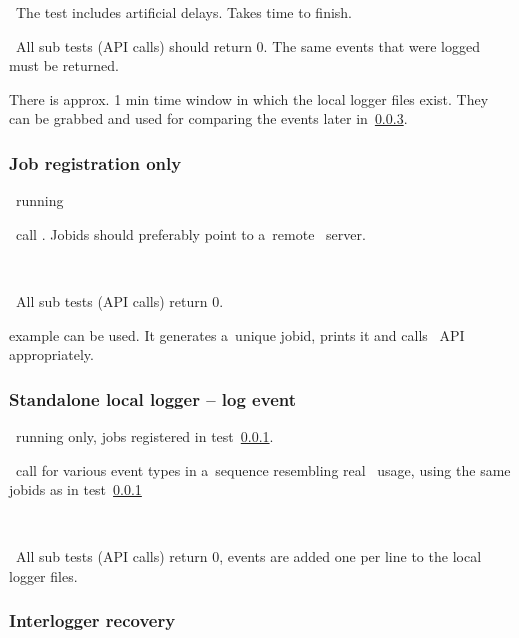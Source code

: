 \note\ The test includes artificial delays. Takes time to finish.

\result\ All sub tests (API calls) should return 0. The same events that were logged must be returned.

\begin{hints}
There is approx. 1 min time window in which the local logger files exist.
They can be grabbed and used for comparing the events later in~\ref{recover}.
\end{hints}



\subsubsection{Job registration only}
\label{reg}
\req\ running 

\what\ call . Jobids should preferably point
to a~remote \LB\ server.

\how\ 

\result\ All sub tests (API calls) return 0.

\begin{hints}
 example can be used. It generates a~unique jobid,
prints it and calls \LB\ API appropriately.
\end{hints}



\subsubsection{Standalone local logger -- log event}
\label{log}

\req\ running  only, jobs registered in test~\ref{reg}.

\what\ call  for various event types in a~sequence
resembling real \LB\ usage, using the same jobids as in test~\ref{reg}

\how\ 

\result\ All sub tests (API calls) return 0, events are added one per line to the local logger files.



\subsubsection{Interlogger recovery}
\label{recover}

